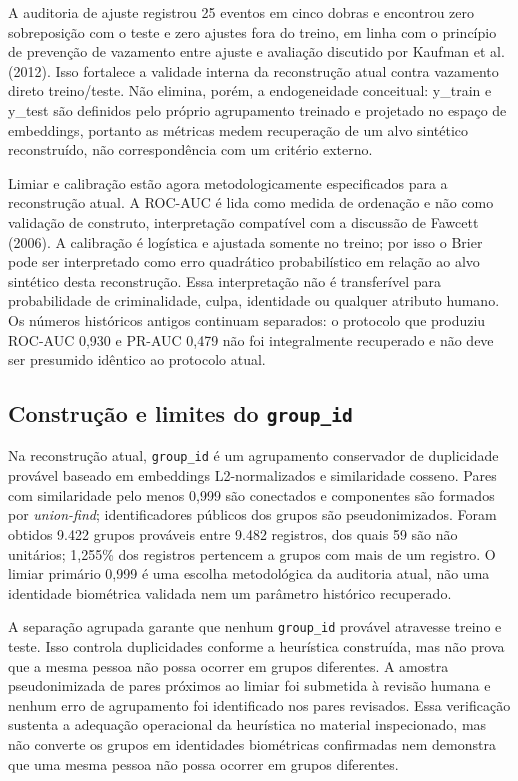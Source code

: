 A auditoria de ajuste registrou 25 eventos em cinco dobras e encontrou zero sobreposição com o teste e zero ajustes fora do treino, em linha com o princípio de prevenção de vazamento entre ajuste e avaliação discutido por Kaufman et al. (2012). Isso fortalece a validade interna da reconstrução atual contra vazamento direto treino/teste. Não elimina, porém, a endogeneidade conceitual: y\_train e y\_test são definidos pelo próprio agrupamento treinado e projetado no espaço de embeddings, portanto as métricas medem recuperação de um alvo sintético reconstruído, não correspondência com um critério externo.

Limiar e calibração estão agora metodologicamente especificados para a reconstrução atual. A ROC-AUC é lida como medida de ordenação e não como validação de construto, interpretação compatível com a discussão de Fawcett (2006). A calibração é logística e ajustada somente no treino; por isso o Brier pode ser interpretado como erro quadrático probabilístico em relação ao alvo sintético desta reconstrução. Essa interpretação não é transferível para probabilidade de criminalidade, culpa, identidade ou qualquer atributo humano. Os números históricos antigos continuam separados: o protocolo que produziu ROC-AUC 0,930 e PR-AUC 0,479 não foi integralmente recuperado e não deve ser presumido idêntico ao protocolo atual.

\subsection{Construção e limites do \texttt{group\_id}}

Na reconstrução atual, \texttt{group\_id} é um agrupamento conservador de duplicidade provável baseado em embeddings L2-normalizados e similaridade cosseno. Pares com similaridade pelo menos 0,999 são conectados e componentes são formados por \emph{union-find}; identificadores públicos dos grupos são pseudonimizados. Foram obtidos 9.422 grupos prováveis entre 9.482 registros, dos quais 59 são não unitários; 1,255\% dos registros pertencem a grupos com mais de um registro. O limiar primário 0,999 é uma escolha metodológica da auditoria atual, não uma identidade biométrica validada nem um parâmetro histórico recuperado.

A separação agrupada garante que nenhum \texttt{group\_id} provável atravesse treino e teste. Isso controla duplicidades conforme a heurística construída, mas não prova que a mesma pessoa não possa ocorrer em grupos diferentes. A amostra pseudonimizada de pares próximos ao limiar foi submetida à revisão humana e nenhum erro de agrupamento foi identificado nos pares revisados. Essa verificação sustenta a adequação operacional da heurística no material inspecionado, mas não converte os grupos em identidades biométricas confirmadas nem demonstra que uma mesma pessoa não possa ocorrer em grupos diferentes.

